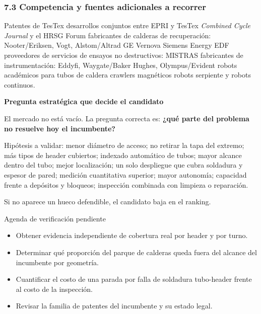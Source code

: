 \documentclass[11pt,a4paper]{article}
\newenvironment{notaclave}[1]
  {\begin{notaclavebase}{\sffamily\scriptsize\bfseries\color{amber}#1}\par\vspace{2pt}}
  {\end{notaclavebase}}
\newenvironment{detalle}[1]{\begin{detallebase}{#1}}{\end{detallebase}}
\begin{document}
\subsubsection*{7.3 Competencia y fuentes adicionales a recorrer}

Patentes de TesTex \textperiodcentered{} desarrollos conjuntos entre EPRI y TesTex \textperiodcentered{} \emph{Combined Cycle Journal} y el HRSG Forum \textperiodcentered{} fabricantes de calderas de recuperación: Nooter/Eriksen, Vogt, Alstom/Altrad \textperiodcentered{} GE Vernova \textperiodcentered{} Siemens Energy \textperiodcentered{} EDF \textperiodcentered{} proveedores de servicios de ensayos no destructivos: MISTRAS \textperiodcentered{} fabricantes de instrumentación: Eddyfi, Waygate/Baker Hughes, Olympus/Evident \textperiodcentered{} robots académicos para tubos de caldera \textperiodcentered{} crawlers magnéticos \textperiodcentered{} robots serpiente y robots continuos.

\begin{notaclave}{Pregunta estratégica que decide el candidato}
El mercado no está vacío. La pregunta correcta es: \textbf{¿qué parte del problema no resuelve hoy el incumbente?}

Hipótesis a validar: menor diámetro de acceso; no retirar la tapa del extremo; más tipos de header cubiertos; indexado automático de tubos; mayor alcance dentro del tubo; mejor localización; un solo despliegue que cubra soldadura y espesor de pared; medición cuantitativa superior; mayor autonomía; capacidad frente a depósitos y bloqueos; inspección combinada con limpieza o reparación.

Si no aparece un hueco defendible, el candidato baja en el ranking.

\end{notaclave}
\begin{detalle}{Agenda de verificación pendiente}
\begin{itemize}
\item Obtener evidencia independiente de cobertura real por header y por turno.
\item Determinar qué proporción del parque de calderas queda fuera del alcance del incumbente por geometría.
\item Cuantificar el costo de una parada por falla de soldadura tubo-header frente al costo de la inspección.
\item Revisar la familia de patentes del incumbente y su estado legal.
\end{itemize}

\end{detalle}
\end{document}
